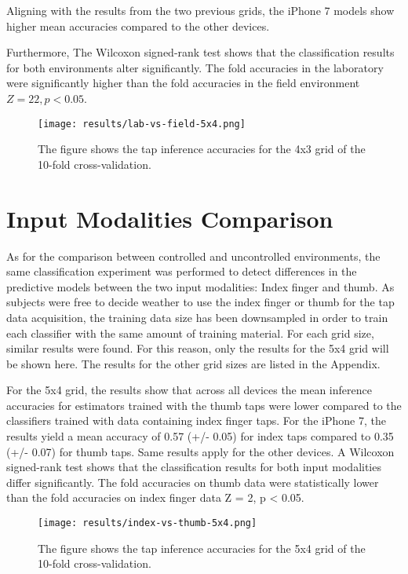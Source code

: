 Aligning with the results from the two previous grids, the iPhone 7 models show higher mean accuracies compared to the other devices. 

Furthermore, The Wilcoxon signed-rank test shows that the classification results for both environments alter significantly. The fold accuracies in the laboratory were significantly higher than the fold accuracies in the field environment $Z = 22, p < 0.05$.

\begin{figure}[h!]
  \centering
  \texttt{[image: results/lab-vs-field-5x4.png]}
  \caption{The figure shows the tap inference accuracies for the 4x3 grid of the 10-fold cross-validation.} \label{fig:participation}
\end{figure}

\section{Input Modalities Comparison}
As for the comparison between controlled and uncontrolled environments, the same classification experiment was performed to detect differences in the predictive models between the two input modalities: Index finger and thumb. As subjects were free to decide weather to use the index finger or thumb for the tap data acquisition, the training data size has been downsampled in order to train each classifier with the same amount of training material. For each grid size, similar results were found. For this reason, only the results for the 5x4 grid will be shown here. The results for the other grid sizes are listed in the Appendix. %

For the 5x4 grid, the results show that across all devices the mean inference accuracies for estimators trained with the thumb taps were lower compared to the classifiers trained with data containing index finger taps. For the iPhone 7, the results yield a mean accuracy of 0.57 (+/- 0.05) for index taps compared to 0.35 (+/- 0.07) for thumb taps. Same results apply for the other devices. A Wilcoxon signed-rank test shows that the classification results for both input modalities differ significantly. The fold accuracies on thumb data were statistically lower than the fold accuracies on index finger data Z = 2, p < 0.05.


\begin{figure}[h!]
  \centering
  \texttt{[image: results/index-vs-thumb-5x4.png]}
  \caption{The figure shows the tap inference accuracies for the 5x4 grid of the 10-fold cross-validation.} \label{fig:participation}
\end{figure}

